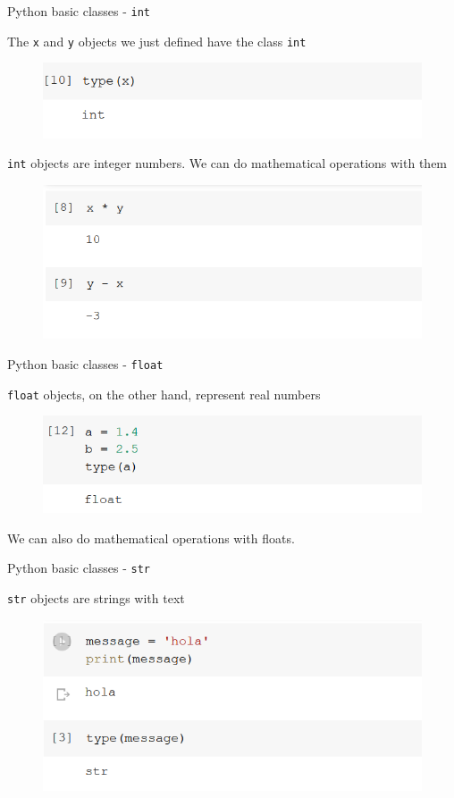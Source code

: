 \documentclass[aspectratio=169]{beamer}
\begin{document}
\begin{frame}{Python basic classes - \texttt{int}}

	The \texttt{x} and \texttt{y} objects we just defined have the class \texttt{int}

	\begin{figure}
		\centering
		\includegraphics[width=0.6\linewidth]{img/type_int.png}
	\end{figure}

	\texttt{int} objects are integer numbers. We can do mathematical operations with them
	\begin{figure}
		\centering
		\includegraphics[width=0.6\linewidth]{img/math_integers.png}
	\end{figure}

\end{frame}

\begin{frame}{Python basic classes - \texttt{float}}

	\texttt{float} objects, on the other hand, represent real numbers

	\begin{figure}
		\centering
		\includegraphics[width=0.6\linewidth]{img/type_float.png}
	\end{figure}

	We can also do mathematical operations with floats.

\end{frame}

\begin{frame}{Python basic classes - \texttt{str}}

	\texttt{str} objects are strings with text

	\begin{figure}
		\centering
		\includegraphics[width=0.6\linewidth]{img/string_type.png}
	\end{figure}

\end{frame}
\end{document}

